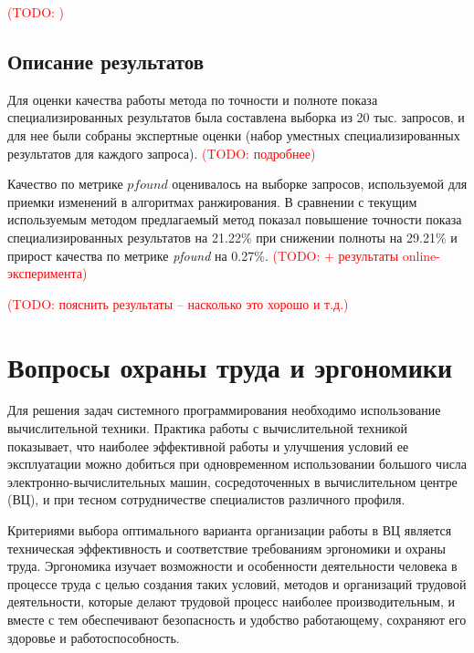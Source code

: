 \documentclass[12pt,a4paper]{report}
\newcommand\note[1]{\textcolor{red}{(#1)}}
\newcommand\todonote[1]{\note{TODO: #1}}
\begin{document}
\todonote{}

\section{Описание результатов}

Для оценки качества работы метода по точности и полноте показа специализированных результатов была составлена выборка из 20 тыс. запросов, и для нее были собраны экспертные оценки (набор уместных специализированных результатов для каждого запроса). 
\todonote{подробнее}

Качество по метрике $pfound$ оценивалось на выборке запросов, используемой для приемки изменений в алгоритмах ранжирования.
В сравнении с текущим используемым методом предлагаемый метод показал повышение точности показа специализированных результатов на 21.22\% при снижении полноты на 29.21\% и прирост качества по метрике \textit{pfound} на 0.27\%. \todonote{+ результаты online-эксперимента}


\todonote{пояснить результаты -- насколько это хорошо и т.д.}

\chapter{Вопросы охраны труда и эргономики}

Для решения задач системного программирования необходимо использование вычислительной техники. Практика работы с вычислительной техникой показывает, что наиболее эффективной работы и улучшения условий ее эксплуатации можно добиться при одновременном использовании большого числа электронно-вычислительных машин, сосредоточенных в вычислительном центре (ВЦ), и при тесном сотрудничестве специалистов различного профиля.

Критериями выбора оптимального варианта организации работы в ВЦ является техническая эффективность и соответствие требованиям эргономики и охраны труда. Эргономика изучает возможности и особенности деятельности человека в процессе труда с целью создания таких условий, методов и организаций трудовой деятельности, которые делают трудовой процесс наиболее производительным, и вместе с тем обеспечивают безопасность и удобство работающему, сохраняют его здоровье и работоспособность.
\end{document}
